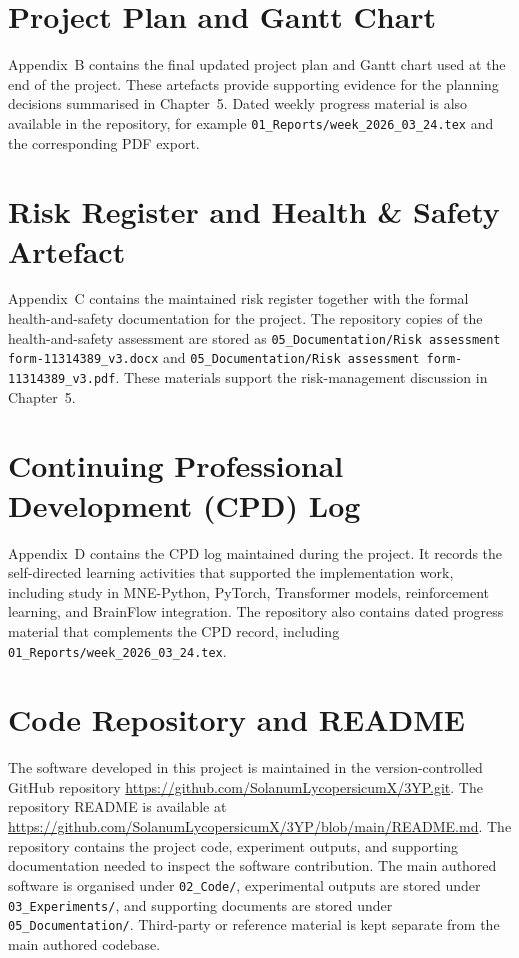 \documentclass[12pt, a4paper]{article}
\begin{document}
\section{Project Plan and Gantt Chart}

Appendix~B contains the final updated project plan and Gantt chart used at the end of the project. These artefacts provide supporting evidence for the planning decisions summarised in Chapter~5. Dated weekly progress material is also available in the repository, for example \texttt{01\_Reports/week\_2026\_03\_24.tex} and the corresponding PDF export.

\section{Risk Register and Health \& Safety Artefact}

Appendix~C contains the maintained risk register together with the formal health-and-safety documentation for the project. The repository copies of the health-and-safety assessment are stored as \texttt{05\_Documentation/Risk assessment form-11314389\_v3.docx} and \texttt{05\_Documentation/Risk assessment form-11314389\_v3.pdf}. These materials support the risk-management discussion in Chapter~5.

\section{Continuing Professional Development (CPD) Log}

Appendix~D contains the CPD log maintained during the project. It records the self-directed learning activities that supported the implementation work, including study in MNE-Python, PyTorch, Transformer models, reinforcement learning, and BrainFlow integration. The repository also contains dated progress material that complements the CPD record, including \texttt{01\_Reports/week\_2026\_03\_24.tex}.

\section{Code Repository and README}

The software developed in this project is maintained in the version-controlled GitHub repository \url{https://github.com/SolanumLycopersicumX/3YP.git}. The repository README is available at \url{https://github.com/SolanumLycopersicumX/3YP/blob/main/README.md}. The repository contains the project code, experiment outputs, and supporting documentation needed to inspect the software contribution. The main authored software is organised under \texttt{02\_Code/}, experimental outputs are stored under \texttt{03\_Experiments/}, and supporting documents are stored under \texttt{05\_Documentation/}. Third-party or reference material is kept separate from the main authored codebase.
\end{document}
